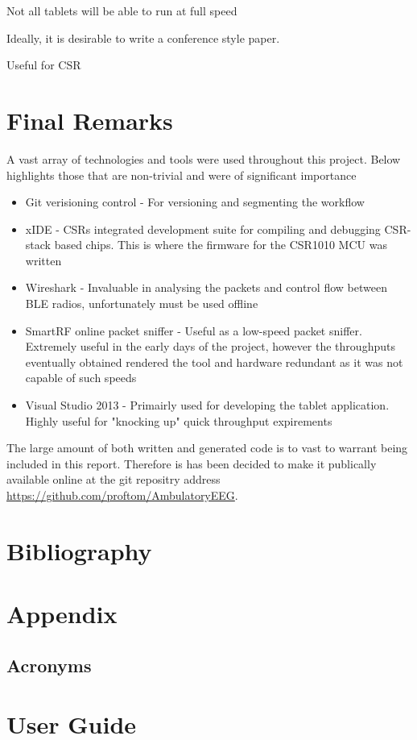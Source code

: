 \documentclass[]{article}
\begin{document}
Not all tablets will be able to run at full speed

Ideally, it is desirable to write a conference style paper. 

Useful for CSR
\section{Final Remarks}
A vast array of technologies and tools were used throughout this project. Below highlights those that are non-trivial and were of significant importance

\begin{itemize}
	\item Git verisioning control - For versioning and segmenting the workflow
	\item xIDE - CSRs integrated development suite for compiling and debugging CSR-stack based chips. This is where the firmware for the CSR1010 MCU was written
	\item Wireshark - Invaluable in analysing the packets and control flow between BLE radios, unfortunately must be used offline
	\item SmartRF online packet sniffer - Useful as a low-speed packet sniffer. Extremely useful in the early days of the project, however the throughputs eventually obtained rendered the tool and hardware redundant as it was not capable of such speeds
	\item Visual Studio 2013 - Primairly used for developing the tablet application. Highly useful for "knocking up" quick throughput expirements 
\end{itemize}

The large amount of both written and generated code is to vast to warrant being included in this report. Therefore is has been decided to make it publically available online at the git repositry address 
\url{https://github.com/proftom/AmbulatoryEEG}.

\section{Bibliography}
\clearpage

\nocite{*}

\printbibliography


\section{Appendix}
\subsection{Acronyms}
\begin{acronym}
\end{acronym}

\section{User Guide}
\end{document}
